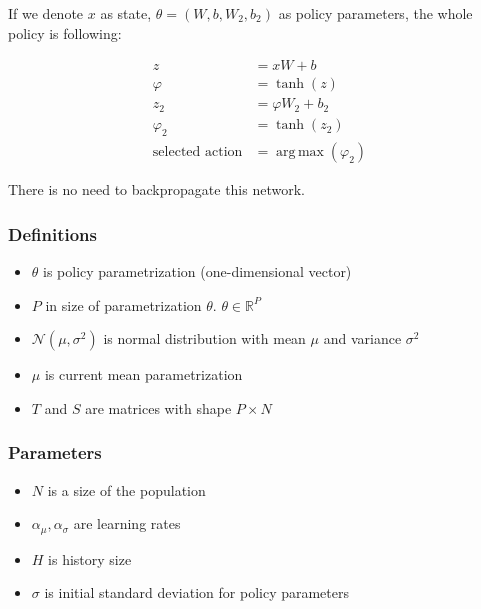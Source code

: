 \documentclass[12pt]{article}
\DeclareMathOperator*{\argmax}{arg\,max}
\begin{document}
If we denote $x$ as state, $\theta = (W,b,W_2,b_2)$ as policy parameters, the whole policy is following:

\begin{equation}
\begin{aligned}
z &= xW + b \\
\varphi &= \tanh(z) \\
z_2 &= \varphi W_2 + b_2 \\
\varphi_2 &= \tanh(z_2) \\
\text{selected action} &= \argmax(\varphi_2)
\end{aligned}
\end{equation}

There is no need to backpropagate this network.

\subsubsection{Definitions}

\begin{itemize}

\item $\theta$ is policy parametrization (one-dimensional vector)

\item $P$ in size of parametrization $\theta$. $\theta \in \mathbb{R}^P$

\item $\mathcal{N}(\mu, \sigma^2)$ is normal distribution with mean $\mu$ and variance $\sigma^2$

\item $\mu$ is current mean parametrization

\item $T$ and $S$ are matrices with shape $P\times N$

\end{itemize}

\subsubsection{Parameters}

\begin{itemize}
\item $N$ is a size of the population
\item $\alpha_\mu, \alpha_\sigma$ are learning rates
\item $H$ is history size
\item $\sigma$ is initial standard deviation for policy parameters

\end{itemize}
\end{document}
